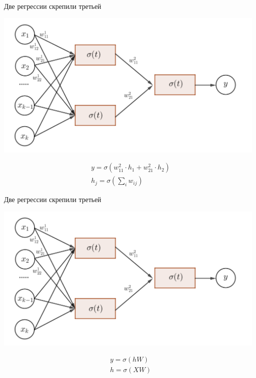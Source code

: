 \documentclass[notes,12pt, aspectratio=169]{beamer}
\begin{document}
\begin{frame}{Две регрессии скрепили третьей}
\begin{center}
	\includegraphics[width=0.7\paperwidth]{neuron_4.png}
\end{center}
\begin{equation*}
\begin{aligned}
&y = \sigma(w_{11}^2 \cdot h_1 + w_{21}^2 \cdot h_2) \\
&h_j = \sigma(\sum_i w_{ij})
\end{aligned}
\end{equation*}
\end{frame}


\begin{frame}{Две регрессии скрепили третьей}
\begin{center}
	\includegraphics[width=0.7\paperwidth]{neuron_4.png}
\end{center}
\begin{equation*}
\begin{aligned}
&y = \sigma(hW) \\
&h = \sigma(XW)
\end{aligned}
\end{equation*}
\end{frame}
\end{document}
